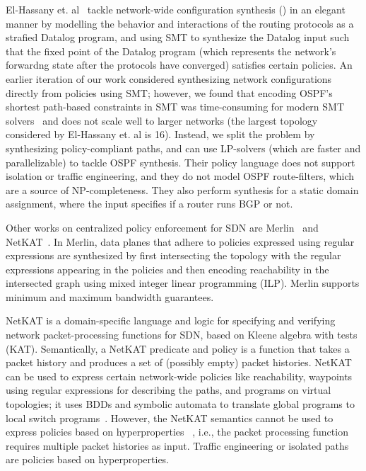 El-Hassany et. al~\cite{synet} tackle network-wide
configuration synthesis () in an
elegant manner by modelling the behavior and interactions of the routing
protocols as a strafied Datalog program, and using 
SMT to synthesize the Datalog input such that the fixed
point of the Datalog program 
(which represents the network's forwardng state after the 
protocols have converged) satisfies certain policies.
An earlier iteration of our work considered synthesizing
network configurations directly from policies using SMT;
however, we found that encoding OSPF's 
shortest path-based constraints in SMT 
was time-consuming for modern SMT solvers~\cite{z3} 
and does not scale well to larger
networks (the largest topology considered by 
El-Hassany et. al is 16). Instead, we split the 
problem by synthesizing policy-compliant paths,
and can use LP-solvers (which are 
faster and parallelizable) to tackle OSPF synthesis. 
Their policy language does not support isolation or 
traffic engineering, and they do not model 
OSPF route-filters, which are a source of NP-completeness.
They also perform synthesis for a static domain assignment, where
the input specifies if a router runs BGP or not.

Other works on centralized policy enforcement 
for SDN are Merlin~\cite{merlin} and NetKAT~\cite{netkat}.  
In Merlin, data planes that adhere to policies
expressed using regular expressions are synthesized by first
intersecting the topology with the regular expressions appearing in
the policies and then encoding reachability in the intersected graph
using mixed integer linear programming (ILP).
Merlin supports minimum and maximum bandwidth guarantees.

NetKAT is a domain-specific language and logic for 
specifying and verifying network packet-processing functions
for SDN, based on Kleene algebra with tests (KAT). Semantically,
a NetKAT predicate and policy is a function that takes a packet
history and produces a set of (possibly empty) packet histories. 
NetKAT can be used to express certain network-wide policies like 
reachability, waypoints using regular expressions for describing the paths, 
and programs on virtual topologies; it uses
BDDs and symbolic automata to translate global programs to local
switch programs~\cite{netkatcompiler}. 
However, the NetKAT semantics
cannot be used to express policies based on hyperproperties
~\cite{hyperproperties}, i.e., 
the packet processing function requires multiple packet histories
as input. Traffic engineering or isolated paths are policies
based on hyperproperties. 

